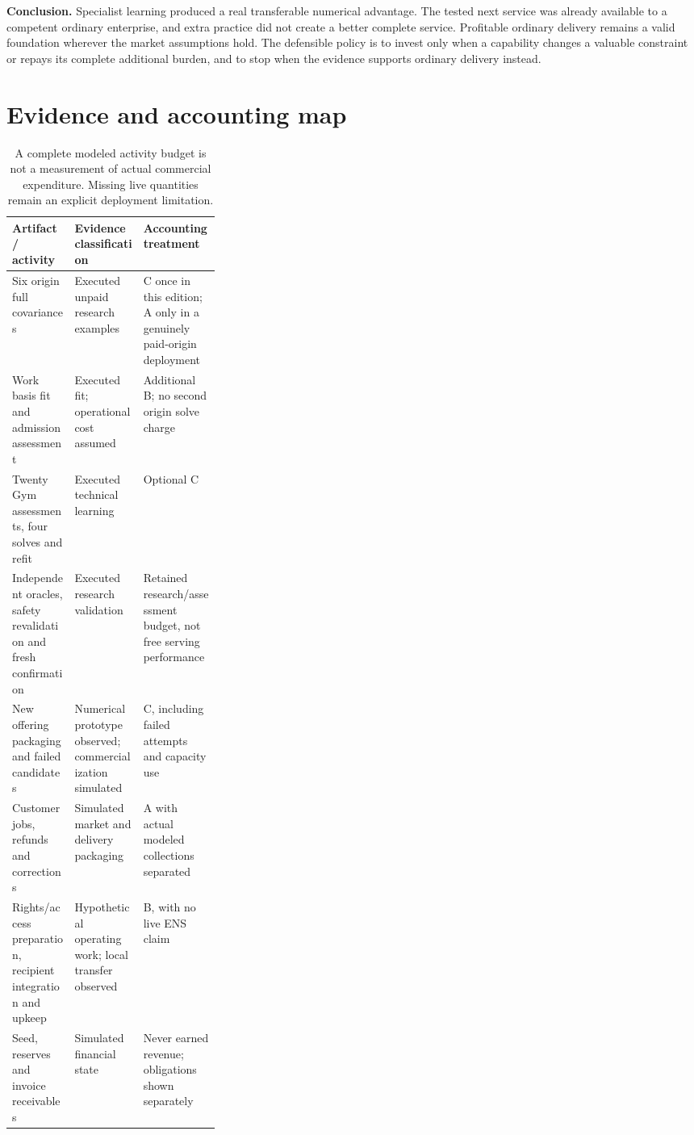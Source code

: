 \documentclass[11pt,letterpaper]{article}
\begin{document}
\textbf{Conclusion.} Specialist learning produced a real transferable numerical advantage. The tested next service was already available to a competent ordinary enterprise, and extra practice did not create a better complete service. Profitable ordinary delivery remains a valid foundation wherever the market assumptions hold. The defensible policy is to invest only when a capability changes a valuable constraint or repays its complete additional burden, and to stop when the evidence supports ordinary delivery instead.

\appendix
\section{Evidence and accounting map}

\begin{table}[htbp]\centering\footnotesize
\begin{tabularx}{\linewidth}{p{0.30\linewidth}YY}\toprule
Artifact / activity & Evidence classification & Accounting treatment\\\midrule
Six origin full covariances & Executed unpaid research examples & C once in this edition; A only in a genuinely paid-origin deployment\\
Work basis fit and admission assessment & Executed fit; operational cost assumed & Additional B; no second origin solve charge\\
Twenty Gym assessments, four solves and refit & Executed technical learning & Optional C\\
Independent oracles, safety revalidation and fresh confirmation & Executed research validation & Retained research/assessment budget, not free serving performance\\
New offering packaging and failed candidates & Numerical prototype observed; commercialization simulated & C, including failed attempts and capacity use\\
Customer jobs, refunds and corrections & Simulated market and delivery packaging & A with actual modeled collections separated\\
Rights/access preparation, recipient integration and upkeep & Hypothetical operating work; local transfer observed & B, with no live ENS claim\\
Seed, reserves and invoice receivables & Simulated financial state & Never earned revenue; obligations shown separately\\\bottomrule
\end{tabularx}
\caption{A complete modeled activity budget is not a measurement of actual commercial expenditure. Missing live quantities remain an explicit deployment limitation.}
\end{table}
\end{document}
